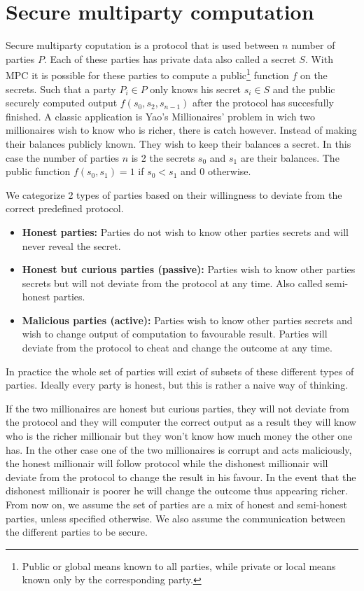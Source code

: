 \section{Secure multiparty computation}
Secure multiparty coputation is a protocol that is used between $n$ number of parties $P$. Each of these parties has private data also called a secret $S$. With MPC it is possible for these parties to compute a public\footnote{Public or global means known to all parties, while private or local means known only by the corresponding party.} function $f$ on the secrets. Such that a party $P_i \in P$ only knows his secret $s_i \in S$ and the public securely computed output $f(s_0,s_2,s_{n-1})$ after the protocol has succesfully finished.
\newline
A classic application is Yao's Millionaires' problem \cite{yao1982protocols} in wich two millionaires wish to know who is richer, there is catch however. Instead of making their balances publicly known. They wish to keep their balances a secret. In this case the number of parties $n$ is 2 the secrets $s_0$ and $s_1$ are their balances. The public function $f(s_0,s_1)=1$ if $s_0<s_1$ and $0$ otherwise.

We categorize 2 types of parties based on their willingness to deviate from the correct predefined protocol.
\begin{itemize}
  \item \textbf{Honest parties:} Parties do not wish to know other parties secrets and will never reveal the secret.
  \item \textbf{Honest but curious parties (passive):} Parties wish to know other parties secrets but will not deviate from the protocol at any time. Also called semi-honest parties.
  \item \textbf{Malicious parties (active):} Parties wish to know other parties secrets and wish to change output of computation to favourable result. Parties will deviate from the protocol to cheat and change the outcome at any time.
\end{itemize}
In practice the whole set of parties will exist of subsets of these different types of parties. Ideally every party is honest, but this is rather a naive way of thinking.


If the two millionaires are honest but curious parties, they will not deviate from the protocol and they will computer the correct output as a result they will know who is the richer millionair but they won't know how much money the other one has. In the other case one of the two millionaires is corrupt and acts maliciously, the honest millionair will follow protocol while the dishonest millionair will deviate from the protocol to change the result in his favour. In the event that the dishonest millionair is poorer he will change the outcome thus appearing richer.
From now on, we assume the set of parties are a mix of honest and semi-honest parties, unless specified otherwise. We also assume the communication between the different parties to be secure.

